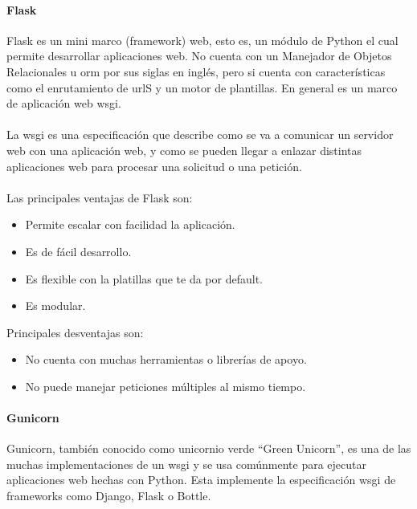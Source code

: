 \documentclass[12pt, a4paper, titlepage]{report}
\begin{document}
		   	\paragraph{Flask \\}
		   	Flask es un mini marco (framework) web, esto es, un módulo de Python el cual permite desarrollar aplicaciones web. No cuenta con un Manejador de Objetos Relacionales u \acrshort{orm} por sus siglas en inglés, pero si cuenta con características como el enrutamiento de \acrshort{url}S y un motor de plantillas. En general es un marco de aplicación web \acrshort{wsgi}.\\\\
		   	La \acrfull{wsgi} es una especificación que describe como se va a comunicar un servidor web con una aplicación web, y como se pueden llegar a enlazar distintas aplicaciones web para procesar una solicitud o una petición.\\\\
		   	Las principales ventajas de Flask son: 
		   	\begin{itemize}
		   	\item Permite escalar con facilidad la aplicación.
		   	\item Es de fácil desarrollo.
		   	\item Es flexible con la platillas que te da por default.
		   	\item Es modular.
		   	\end{itemize}
		   	
		   	Principales desventajas son: 
		   	\begin{itemize}
		   	\item No cuenta con muchas herramientas o librerías de apoyo.
		   	\item No puede manejar peticiones múltiples al mismo tiempo.
		   	\end{itemize}
		   	
		   	\paragraph{Gunicorn \\}
		   	
		   	Gunicorn, también conocido como unicornio verde “Green Unicorn”, es una de las muchas implementaciones de un \acrfull{wsgi} y se usa comúnmente para ejecutar aplicaciones web hechas con Python. Esta implemente la especificación \acrshort{wsgi} de frameworks como Django, Flask o Bottle.
		   	
\end{document}

